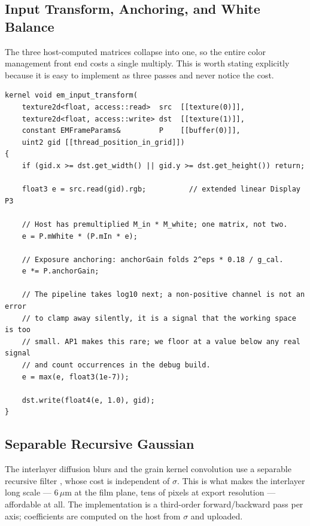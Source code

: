 \subsection{Input Transform, Anchoring, and White Balance}

The three host-computed matrices collapse into one, so the entire color
management front end costs a single multiply. This is worth stating explicitly
because it is easy to implement as three passes and never notice the cost.

\begin{lstlisting}[language=Metal, caption={Fused input transform.}]
kernel void em_input_transform(
    texture2d<float, access::read>  src  [[texture(0)]],
    texture2d<float, access::write> dst  [[texture(1)]],
    constant EMFrameParams&         P    [[buffer(0)]],
    uint2 gid [[thread_position_in_grid]])
{
    if (gid.x >= dst.get_width() || gid.y >= dst.get_height()) return;

    float3 e = src.read(gid).rgb;          // extended linear Display P3

    // Host has premultiplied M_in * M_white; one matrix, not two.
    e = P.mWhite * (P.mIn * e);

    // Exposure anchoring: anchorGain folds 2^eps * 0.18 / g_cal.
    e *= P.anchorGain;

    // The pipeline takes log10 next; a non-positive channel is not an error
    // to clamp away silently, it is a signal that the working space is too
    // small. AP1 makes this rare; we floor at a value below any real signal
    // and count occurrences in the debug build.
    e = max(e, float3(1e-7));

    dst.write(float4(e, 1.0), gid);
}
\end{lstlisting}

\subsection{Separable Recursive Gaussian}
\label{app:recursive}

The interlayer diffusion blurs and the grain kernel convolution use a separable
recursive filter \cite{deriche1993,young1995}, whose cost is independent of
$\sigma$. This is what makes the interlayer long scale --- $6\,\mu$m at the film
plane, tens of pixels at export resolution --- affordable at all. The
implementation is a third-order forward/backward pass per axis; coefficients are
computed on the host from $\sigma$ and uploaded.

